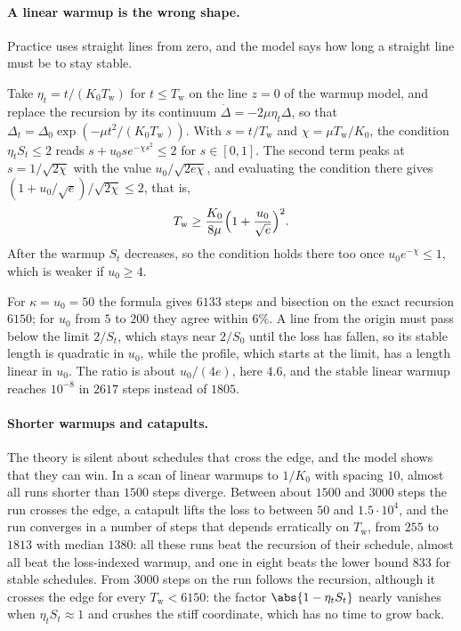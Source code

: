 \begin{refsection}
\paragraph{A linear warmup is the wrong shape.} Practice uses straight lines from zero, and the model says how long a straight line must be to stay stable.

\begin{heuristic}
Take $\eta_t=t/(K_0T_{\mathrm w})$ for $t\le T_{\mathrm w}$ on the line $z=0$ of the warmup model, and replace the recursion by its continuum $\dot\Delta=-2\mu\eta_t\Delta$, so that $\Delta_t=\Delta_0\exp(-\mu t^2/(K_0T_{\mathrm w}))$. With $s=t/T_{\mathrm w}$ and $\chi=\mu T_{\mathrm w}/K_0$, the condition $\eta_tS_t\le2$ reads $s+u_0se^{-\chi s^2}\le2$ for $s\in[0,1]$. The second term peaks at $s=1/\sqrt{2\chi}$ with the value $u_0/\sqrt{2e\chi}$, and evaluating the condition there gives $(1+u_0/\sqrt e)/\sqrt{2\chi}\le2$, that is,
\[
  T_{\mathrm w}\ge\frac{K_0}{8\mu}\Bigl(1+\frac{u_0}{\sqrt e}\Bigr)^2.
\]
After the warmup $S_t$ decreases, so the condition holds there too once $u_0e^{-\chi}\le1$, which is weaker if $u_0\ge4$.
\end{heuristic}

For $\kappa=u_0=50$ the formula gives $6133$ steps and bisection on the exact recursion $6150$; for $u_0$ from $5$ to $200$ they agree within $6\%$. A line from the origin must pass below the limit $2/S_t$, which stays near $2/S_0$ until the loss has fallen, so its stable length is quadratic in $u_0$, while the profile, which starts at the limit, has a length linear in $u_0$. The ratio is about $u_0/(4e)$, here $4.6$, and the stable linear warmup reaches $10^{-8}$ in $2617$ steps instead of $1805$.

\paragraph{Shorter warmups and catapults.} The theory is silent about schedules that cross the edge, and the model shows that they can win. In a scan of linear warmups to $1/K_0$ with spacing $10$, almost all runs shorter than $1500$ steps diverge. Between about $1500$ and $3000$ steps the run crosses the edge, a catapult lifts the loss to between $50$ and $1.5\cdot10^4$, and the run converges in a number of steps that depends erratically on $T_{\mathrm w}$, from $255$ to $1813$ with median $1380$: all these runs beat the recursion of their schedule, almost all beat the loss-indexed warmup, and one in eight beats the lower bound $833$ for stable schedules. From $3000$ steps on the run follows the recursion, although it crosses the edge for every $T_{\mathrm w}<6150$: the factor $\abs{1-\eta_tS_t}$ nearly vanishes when $\eta_tS_t\approx1$ and crushes the stiff coordinate, which has no time to grow back.


\end{refsection}
